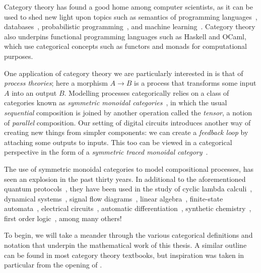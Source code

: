 Category theory has found a good home among computer scientists, as
it can be used to shed new light upon topics such as semantics of programming
languages~\cite{oles1982categorytheoretic}, databases~\cite{spivak2012functorial},
probabilistic programming~\cite{cho2019disintegration,fritz2020synthetic}, and
machine learning~\cite{fong2019backprop,cockett2020reverse}.
Category theory also underpins functional programming languages such as
Haskell and OCaml, which use categorical concepts such as functors and monads
for computational purposes.

One application of category theory we are particularly interested in is that of
\emph{process theories}; here a morphism \(A \to B\) is a process that
transforms some input \(A\) into an output \(B\).
Modelling processes categorically relies on a class of categories known as
\emph{symmetric monoidal categories}~\cite{maclane1963natural}, in which the
usual \emph{sequential} composition is joined by another operation called the
\emph{tensor}, a notion of \emph{parallel} composition.
Our setting of digital circuits introduces another way of creating new things
from simpler components: we can create a \emph{feedback loop} by attaching some
outputs to inputs.
This too can be viewed in a categorical perspective in the form of a
\emph{symmetric traced monoidal category}~\cite{joyal1996traced}.

The use of symmetric monoidal categories to model compositional processes, has
seen an explosion in the past thirty years.
In additional to the aforementioned quantum protocols~\cite{coecke2008interacting},
they have been used in the study of cyclic lambda
calculi~\cite{hasegawa1997recursion}, dynamical
systems~\cite{baez2015categories,fong2016categorical}, signal flow
diagrams~\cite{bonchi2014categorical,bonchi2015full,bonchi2017refinement,bonchi2021survey},
linear algebra~\cite{bonchi2017interacting,zanasi2015interacting,bonchi2019graphical,boisseau2022graphical},
finite-state automata~\cite{piedeleu2021string,piedeleu2022finite}, electrical
circuits~\cite{boisseau2022string}, automatic
differentiation~\cite{alvarez-picallo2023functorial}, synthetic
chemistry~\cite{gale2023categorical}, first order
logic~\cite{bonchi2024diagrammatic}, among many others!

To begin, we will take a meander through the various categorical definitions and
notation that underpin the mathematical work of this thesis.
A similar outline can be found in most category theory textbooks, but
inspiration was taken in particular from the opening of
\cite{ghica2023hierarchical}.











